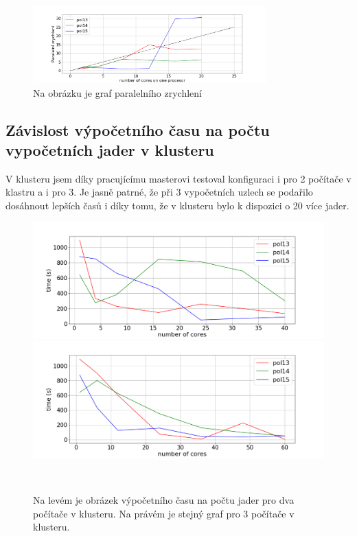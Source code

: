 \documentclass[]{article}
\begin{document}
\begin{figure}[H]\centering
	\includegraphics[width=0.8\textwidth]{img/parralelFastdp}
 	\caption{Na obrázku je graf paralelního zrychlení}\label{a:pfdp}
 \end{figure}


\subsection{Závislost výpočetního času na počtu vypočetních jader v klusteru}

V klusteru jsem díky pracujícímu masterovi testoval konfiguraci i pro 2 počítače v klastru a i pro 3. Je jasně patrné, že při 3 vypočetních uzlech se podařilo dosáhnout lepších časů i díky tomu, že v klusteru bylo k dispozici o 20 více jader.

\begin{figure}[H]
	\centering
    \begin{minipage}[c]{0.49\textwidth}
        \centering\includegraphics[width=\textwidth]{img/nTmpi2} 
    \end{minipage}
    \begin{minipage}[c]{0.49\textwidth}
        \centering \includegraphics[width=\textwidth]{img/nTmpi3} 
    \end{minipage}
    \\
   \caption{Na levém je obrázek výpočetního času na počtu jader pro dva počítače v klusteru. Na právém je stejný graf pro 3 počítače v klusteru.}\label{a:mpii}
    \end{figure}
    
\end{document}

